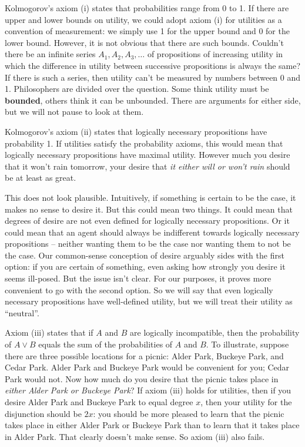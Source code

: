 Kolmogorov's axiom (i) states that probabilities range from 0 to 1. If
there are upper and lower bounds on utility, we could adopt axiom (i)
for utilities as a convention of measurement: we simply use 1 for the
upper bound and 0 for the lower bound. However, it is not obvious that there
are such bounds. Couldn't there be an infinite series $A_1, A_2, A_3,
\ldots$ of propositions of increasing utility in which the difference
in utility between successive propositions is always the same? If
there is such a series, then utility can't be measured by numbers
between 0 and 1. Philosophers are divided over the question. Some
think utility must be \textbf{bounded}, others think it can be
unbounded. There are arguments for either side, but we will not pause
to look at them.

Kolmogorov's axiom (ii) states that logically necessary propositions
have probability 1. If utilities satisfy the probability axioms, this
would mean that logically necessary propositions have maximal
utility. However much you desire that it won't rain tomorrow, your
desire that \emph{it either will or won't rain} should be at least as
great.

This does not look plausible. Intuitively, if something is certain to
be the case, it makes no sense to desire it. But this could mean two
things. It could mean that degrees of desire are not even defined for
logically necessary propositions. Or it could mean that an agent
should always be indifferent towards logically necessary propositions
-- neither wanting them to be the case nor wanting them to not be the
case. Our common-sense conception of desire arguably sides with the
first option: if you are certain of something, even asking how
strongly you desire it seems ill-posed. But the issue isn't 
clear. For our purposes, it proves more convenient to go
with the second option. So we will say that even logically necessary
propositions have well-defined utility, but we will treat their
utility as ``neutral''.


Axiom (iii) states that if $A$ and $B$ are logically incompatible,
then the probability of $A\lor B$ equals the sum of the probabilities
of $A$ and $B$. To illustrate, suppose there are three possible
locations for a picnic: Alder Park, Buckeye Park, and Cedar Park.
Alder Park and Buckeye Park would be convenient for you; Cedar Park
would not. Now how much do you desire that the picnic takes place in
\emph{either Alder Park or Buckeye Park}? If axiom (iii) holds for
utilities, then if you desire Alder Park and Buckeye Park to equal
degree $x$, then your utility for the disjunction should be $2x$: you
should be more pleased to learn that the picnic takes place in either
Alder Park or Buckeye Park than to learn that it takes place in Alder
Park. That clearly doesn't make sense. So axiom (iii) also fails.

